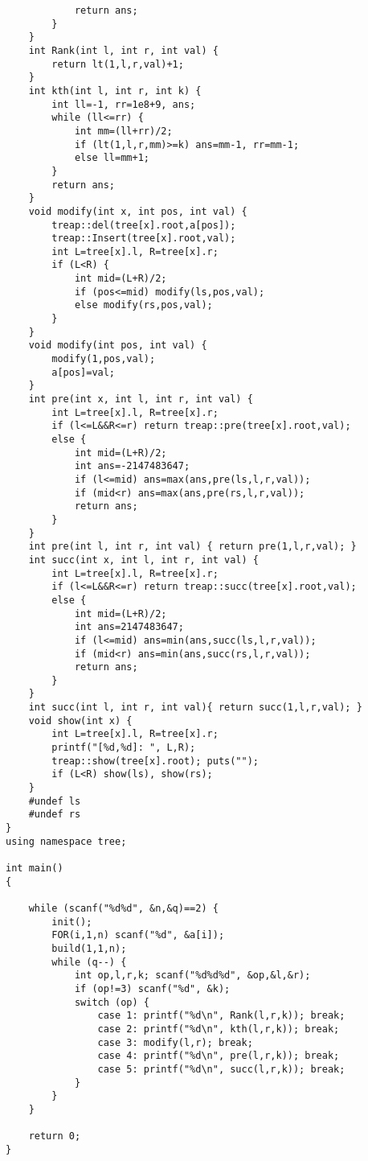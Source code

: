 \begin{lstlisting}
            return ans;
        }
    }
    int Rank(int l, int r, int val) {
        return lt(1,l,r,val)+1;
    }
    int kth(int l, int r, int k) {
        int ll=-1, rr=1e8+9, ans;
        while (ll<=rr) {
            int mm=(ll+rr)/2;
            if (lt(1,l,r,mm)>=k) ans=mm-1, rr=mm-1;
            else ll=mm+1;
        }
        return ans;
    }
    void modify(int x, int pos, int val) {
        treap::del(tree[x].root,a[pos]);
        treap::Insert(tree[x].root,val);
        int L=tree[x].l, R=tree[x].r;
        if (L<R) {
            int mid=(L+R)/2;
            if (pos<=mid) modify(ls,pos,val);
            else modify(rs,pos,val);
        }
    }
    void modify(int pos, int val) {
        modify(1,pos,val);
        a[pos]=val;
    }
    int pre(int x, int l, int r, int val) {
        int L=tree[x].l, R=tree[x].r;
        if (l<=L&&R<=r) return treap::pre(tree[x].root,val);
        else {
            int mid=(L+R)/2;
            int ans=-2147483647;
            if (l<=mid) ans=max(ans,pre(ls,l,r,val));
            if (mid<r) ans=max(ans,pre(rs,l,r,val));
            return ans;
        }
    }
    int pre(int l, int r, int val) { return pre(1,l,r,val); }
    int succ(int x, int l, int r, int val) {
        int L=tree[x].l, R=tree[x].r;
        if (l<=L&&R<=r) return treap::succ(tree[x].root,val);
        else {
            int mid=(L+R)/2;
            int ans=2147483647;
            if (l<=mid) ans=min(ans,succ(ls,l,r,val));
            if (mid<r) ans=min(ans,succ(rs,l,r,val));
            return ans;
        }
    }
    int succ(int l, int r, int val){ return succ(1,l,r,val); }
    void show(int x) {
        int L=tree[x].l, R=tree[x].r;
        printf("[%d,%d]: ", L,R);
        treap::show(tree[x].root); puts("");
        if (L<R) show(ls), show(rs);
    }
    #undef ls
    #undef rs
}
using namespace tree;

int main()
{

    while (scanf("%d%d", &n,&q)==2) {
        init();
        FOR(i,1,n) scanf("%d", &a[i]);
        build(1,1,n);
        while (q--) {
            int op,l,r,k; scanf("%d%d%d", &op,&l,&r);
            if (op!=3) scanf("%d", &k);
            switch (op) {
                case 1: printf("%d\n", Rank(l,r,k)); break;
                case 2: printf("%d\n", kth(l,r,k)); break;
                case 3: modify(l,r); break;
                case 4: printf("%d\n", pre(l,r,k)); break;
                case 5: printf("%d\n", succ(l,r,k)); break;
            }
        }
    }

    return 0;
}
\end{lstlisting}

